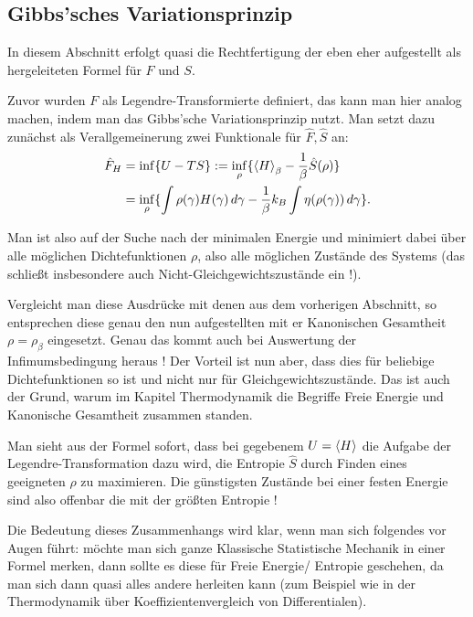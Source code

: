 \documentclass[../KlassMech_main.tex]{subfiles}
\begin{document}
	\subsection{Gibbs'sches Variationsprinzip}
In diesem Abschnitt erfolgt quasi die Rechtfertigung der eben eher aufgestellt als hergeleiteten Formel für $F$ und $S$.

Zuvor wurden $F$ als Legendre-Transformierte definiert, das kann man hier analog machen, indem man das Gibbs'sche Variationsprinzip nutzt. Man setzt dazu zunächst als Verallgemeinerung zwei Funktionale für $\hat{F}, \hat{S}$ an:
\begin{align}\label{key}
\hat{F}_H &= \inf \{U - T S\} := \inf_\rho\{\expval{H}_\beta - \frac{1}{\beta} \hat{S}(\rho)\}
\notag\\
&= \inf_\rho\{ \int \rho(\gamma) H(\gamma) \, d\gamma - \frac{1}{\beta} k_B \int \eta\qty(\rho(\gamma)) \, d\gamma \} .
\end{align}

Man ist also auf der Suche nach der minimalen Energie und minimiert dabei über alle möglichen Dichtefunktionen $\rho$, also alle möglichen Zustände des Systems (das schließt insbesondere auch Nicht-Gleichgewichtszustände ein !).

Vergleicht man diese Ausdrücke mit denen aus dem vorherigen Abschnitt, so entsprechen diese genau den nun aufgestellten mit er Kanonischen Gesamtheit $\rho = \rho_\beta$ eingesetzt. Genau das kommt auch bei Auswertung der Infimumsbedingung heraus ! Der Vorteil ist nun aber, dass dies für beliebige Dichtefunktionen so ist und nicht nur für Gleichgewichtszustände. Das ist auch der Grund, warum im Kapitel Thermodynamik die Begriffe Freie Energie und Kanonische Gesamtheit zusammen standen.

Man sieht aus der Formel sofort, dass bei gegebenem $U = \expval{H}$ die Aufgabe der Legendre-Transformation dazu wird, die Entropie $\hat{S}$ durch Finden eines geeigneten $\rho$ zu maximieren. Die günstigsten Zustände bei einer festen Energie sind also offenbar die mit der größten Entropie !


Die Bedeutung dieses Zusammenhangs wird klar, wenn man sich folgendes vor Augen führt: möchte man sich ganze Klassische Statistische Mechanik in einer Formel merken, dann sollte es diese für Freie Energie/ Entropie geschehen, da man sich dann quasi alles andere herleiten kann (zum Beispiel wie in der Thermodynamik über Koeffizientenvergleich von Differentialen).\\
\end{document}

